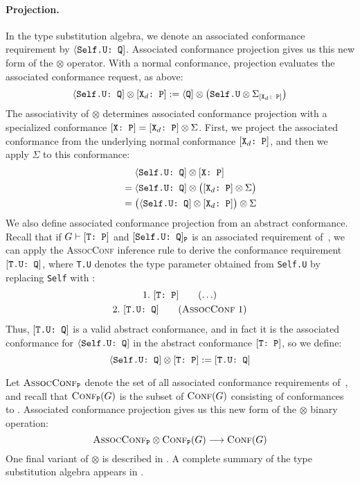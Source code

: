 \documentclass[../generics]{subfiles}
\begin{document}
\paragraph{Projection.}
In the type substitution algebra, we denote an associated conformance requirement by $\langle\texttt{Self.U:~Q}]$. Associated conformance projection gives us this new form of the $\otimes$ operator. With a normal conformance, projection evaluates the associated conformance request, as above:
\[\langle\texttt{Self.U:~Q}] \otimes [\texttt{$\texttt{X}_d$:~P}] := \langle\texttt{Q}] \otimes \big(\texttt{Self.U} \otimes \Sigma_{[\texttt{$\texttt{X}_d$:~P}]}\big)\]
The associativity of $\otimes$ determines associated conformance projection with a specialized conformance $[\texttt{X:~P}]=[\texttt{$\texttt{X}_d$:~P}]\otimes\Sigma$. First, we project the associated conformance from the underlying normal conformance $[\texttt{$\texttt{X}_d$:~P}]$, and then we apply $\Sigma$ to this conformance:
\begin{gather*}
\langle\texttt{Self.U:~Q}]\otimes[\texttt{X:~P}]\\
\qquad {} = \langle\texttt{Self.U:~Q}]\otimes\bigl([\texttt{$\texttt{X}_d$:~P}]\otimes\Sigma\bigr)\\
\qquad {} = \bigl(\langle\texttt{Self.U:~Q}]\otimes[\texttt{$\texttt{X}_d$:~P}]\bigr)\otimes\Sigma
\end{gather*}
We also define associated conformance projection from an abstract conformance. Recall that if $G\vdash[\texttt{T:~P}]$ and $[\texttt{Self.U:~Q}]_{\texttt{P}}$ is an associated requirement of~\tP, we can apply the \textsc{AssocConf} inference rule to derive the conformance requirement $[\texttt{T.U:~Q}]$, where \texttt{T.U} denotes the type parameter obtained from \texttt{Self.U} by replacing \texttt{Self} with \tT:
\begin{gather*}
\AnyStep{\TP}{1}\\
\AssocConfStep{1}{T.U}{Q}{2}
\end{gather*}
Thus, $[\texttt{T.U:~Q}]$ is a valid abstract conformance, and in fact it is the associated conformance for $\langle\texttt{Self.U:~Q}]$ in the abstract conformance $[\texttt{T:~P}]$, so we define:
\[
\langle\texttt{Self.U:~Q}] \otimes [\texttt{T:~P}] := [\texttt{T.U:~Q}]
\]

Let $\textsc{AssocConf}_{\texttt{P}}$ denote the set of all associated conformance requirements of~\tP, and recall that $\textsc{Conf}_{\texttt{P}}({G})$ is the subset of $\textsc{Conf}({G})$ consisting of conformances to \tP. Associated conformance projection gives us this new form of the \index{$\otimes$}$\otimes$ binary operation:
\[\textsc{AssocConf}_{\texttt{P}}\otimes\textsc{Conf}_{\texttt{P}}({G})\longrightarrow\textsc{Conf}({G})\]
One final variant of $\otimes$ is described in . A complete summary of the type substitution algebra appears in .
\end{document}
